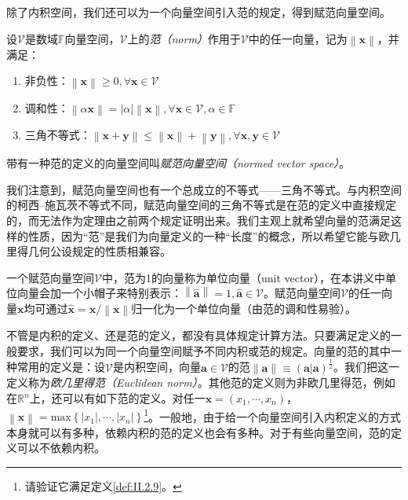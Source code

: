 \documentclass[../main.tex]{subfiles}
\begin{document}
除了内积空间，我们还可以为一个向量空间引入范的规定，得到赋范向量空间。

\begin{definition}[向量的范]\label{def:II.2.9}
    设$\mathcal{V}$是数域$\mathbb{F}$向量空间，$\mathcal{V}$上的\emph{范（norm）}作用于$\mathcal{V}$中的任一向量，记为$\left\|\mathbf{x}\right\|$，并满足：
    \begin{enumerate}
        \item 非负性：$\left\|\mathbf{x}\right\|\geq 0,\forall\mathbf{x}\in\mathcal{V}$
        \item 调和性：$\left\|\alpha\mathbf{x}\right\|=\left|\alpha\right|\left\|\mathbf{x}\right\|,\forall\mathbf{x}\in\mathcal{V},\alpha\in\mathbb{F}$
        \item 三角不等式：$\left\|\mathbf{x}+\mathbf{y}\right\|\leq\left\|\mathbf{x}\right\|+\left\|\mathbf{y}\right\|,\forall\mathbf{x},\mathbf{y}\in\mathcal{V}$
    \end{enumerate}
    带有一种范的定义的向量空间叫\emph{赋范向量空间（normed vector space）}。
\end{definition}

我们注意到，赋范向量空间也有一个总成立的不等式——三角不等式。与内积空间的柯西--施瓦茨不等式不同，赋范向量空间的三角不等式是在范的定义中直接规定的，而无法作为定理由之前两个规定证明出来。我们主观上就希望向量的范满足这样的性质，因为“范”是我们为向量定义的一种“长度”的概念，所以希望它能与欧几里得几何公设规定的性质相兼容。

一个赋范向量空间$\mathcal{V}$中，范为1的向量称为单位向量（unit vector），在本讲义中单位向量会加一个小帽子来特别表示：$\left\|\hat{\mathbf{a}}\right\|=1,\hat{\mathbf{a}}\in\mathcal{V}$。赋范向量空间$\mathcal{V}$的任一向量$\mathbf{x}$均可通过$\hat{\mathbf{x}}=\mathbf{x}/\left\|\mathbf{x}\right\|$归一化为一个单位向量（由范的调和性易验）。

不管是内积的定义、还是范的定义，都没有具体规定计算方法。只要满足定义的一般要求，我们可以为同一个向量空间赋予不同内积或范的规定。向量的范的其中一种常用的定义是：设$\mathcal{V}$是内积空间，向量$\mathbf{a}\in\mathcal{V}$的范$\left\|\mathbf{a}\right\|\equiv\left(\mathbf{a}|\mathbf{a}\right)^{\frac{1}{2}}$。我们把这一定义称为\emph{欧几里得范（Euclidean norm）}。其他范的定义则为非欧几里得范，例如在$\mathbb{R}^n$上，还可以有如下范的定义。对任一$\mathbf{x}=\left(x_1,\cdots,x_n\right)$，$\left\|\mathbf{x}\right\|=\mathrm{max}\left\{\left|x_1\right|,\cdots,\left|x_n\right|\right\}$\footnote{请验证它满足定义\ref{def:II.2.9}。}。一般地，由于给一个向量空间引入内积定义的方式本身就可以有多种，依赖内积的范的定义也会有多种。对于有些向量空间，范的定义可以不依赖内积。
\end{document}
